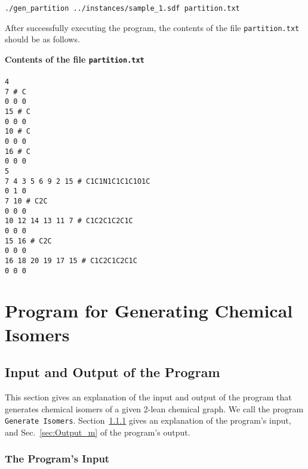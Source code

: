 \documentclass[11pt,titlepage,dvipdfmx,twoside]{article}
\begin{document}
{\tt ./gen\_partition ../instances/sample\_1.sdf partition.txt}

\bigskip

After successfully executing the program, the contents of the file 
{\tt partition.txt} should be as follows.

\begin{oframed}
{\bf Contents of the file {\tt partition.txt}}\\\\
{\tt 4 \\
7 \# C \\
0 0 0 \\
15 \# C \\
0 0 0 \\
10 \# C \\
0 0 0 \\
16 \# C \\
0 0 0 \\
5 \\
7 4 3 5 6 9 2 15 \# C1C1N1C1C1C1O1C \\
0 1 0 \\
7 10 \# C2C \\
0 0 0 \\
10 12 14 13 11 7 \# C1C2C1C2C1C \\
0 0 0 \\
15 16 \# C2C \\
0 0 0 \\
16 18 20 19 17 15 \# C1C2C1C2C1C \\
0 0 0 \\}
\end{oframed}


\section{Program for Generating Chemical Isomers}
\label{sec: main}

\subsection{Input and Output of the Program}
\label{sec:InOut_m}

This section gives an explanation of the input and output
of the program that generates chemical isomers
of a given 2-lean chemical graph.
We call the program {\tt Generate Isomers}.
Section~\ref{sec:Input_m} gives an explanation of the program's input, and
Sec.~\ref{sec:Output_m} of the program's output.

\subsubsection{The Program's Input}
\label{sec:Input_m}
\end{document}
